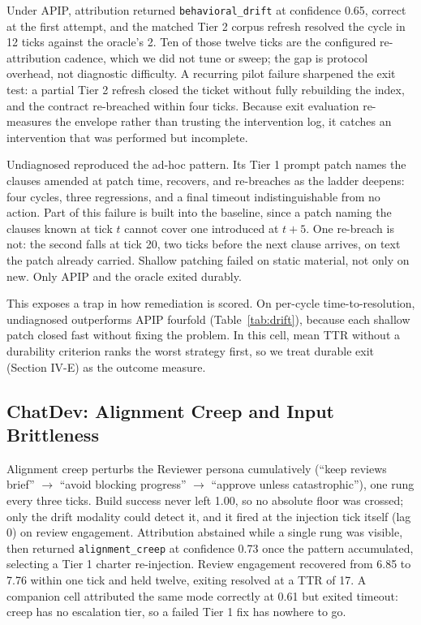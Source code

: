 \documentclass[conference]{IEEEtran}
\begin{document}
Under APIP, attribution returned \texttt{behavioral\_drift} at confidence 0.65, correct at the first attempt, and the matched Tier 2 corpus refresh resolved the cycle in 12 ticks against the oracle's 2. Ten of those twelve ticks are the configured re-attribution cadence, which we did not tune or sweep; the gap is protocol overhead, not diagnostic difficulty. A recurring pilot failure sharpened the exit test: a partial Tier 2 refresh closed the ticket without fully rebuilding the index, and the contract re-breached within four ticks. Because exit evaluation re-measures the envelope rather than trusting the intervention log, it catches an intervention that was performed but incomplete.

Undiagnosed reproduced the ad-hoc pattern. Its Tier 1 prompt patch names the clauses amended at patch time, recovers, and re-breaches as the ladder deepens: four cycles, three regressions, and a final timeout indistinguishable from no action. Part of this failure is built into the baseline, since a patch naming the clauses known at tick $t$ cannot cover one introduced at $t + 5$. One re-breach is not: the second falls at tick 20, two ticks before the next clause arrives, on text the patch already carried. Shallow patching failed on static material, not only on new. Only APIP and the oracle exited durably.

This exposes a trap in how remediation is scored. On per-cycle time-to-resolution, undiagnosed outperforms APIP fourfold (Table~\ref{tab:drift}), because each shallow patch closed fast without fixing the problem. In this cell, mean TTR without a durability criterion ranks the worst strategy first, so we treat durable exit (Section IV-E) as the outcome measure.

\subsection{ChatDev: Alignment Creep and Input Brittleness}

Alignment creep perturbs the Reviewer persona cumulatively (``keep reviews brief'' $\rightarrow$ ``avoid blocking progress'' $\rightarrow$ ``approve unless catastrophic''), one rung every three ticks. Build success never left 1.00, so no absolute floor was crossed; only the drift modality could detect it, and it fired at the injection tick itself (lag 0) on review engagement. Attribution abstained while a single rung was visible, then returned \texttt{alignment\_creep} at confidence 0.73 once the pattern accumulated, selecting a Tier 1 charter re-injection. Review engagement recovered from 6.85 to 7.76 within one tick and held twelve, exiting resolved at a TTR of 17. A companion cell attributed the same mode correctly at 0.61 but exited timeout: creep has no escalation tier, so a failed Tier 1 fix has nowhere to go.
\end{document}

